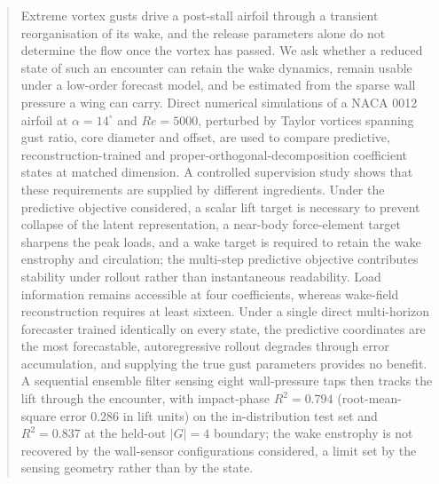 \begin{abstract}
Extreme vortex gusts drive a post-stall airfoil through a transient
reorganisation of its wake, and the release parameters alone do not
determine the flow once the vortex has passed. We ask whether a reduced
state of such an encounter can retain the wake dynamics, remain usable
under a low-order forecast model, and be estimated from the sparse wall
pressure a wing can carry. Direct numerical simulations of a NACA 0012
airfoil at $\alpha = 14^\circ$ and $Re = 5000$, perturbed by Taylor
vortices spanning gust ratio, core diameter and offset, are used to
compare predictive, reconstruction-trained and
proper-orthogonal-decomposition coefficient states at matched dimension.
A controlled supervision study shows that these requirements are
supplied by different ingredients. Under the predictive objective
considered, a scalar lift target is necessary to prevent collapse of the
latent representation, a near-body force-element target sharpens the
peak loads, and a wake target is required to retain the wake enstrophy
and circulation; the multi-step predictive objective contributes
stability under rollout rather than instantaneous readability. Load
information remains accessible at four coefficients, whereas wake-field
reconstruction requires at least sixteen. Under a single direct
multi-horizon forecaster trained identically on every state, the
predictive coordinates are the most forecastable, autoregressive rollout
degrades through error accumulation, and supplying the true gust
parameters provides no benefit. A sequential ensemble filter sensing
eight wall-pressure taps then tracks the lift through the encounter,
with impact-phase $R^2 = 0.794$ (root-mean-square error $0.286$ in lift
units) on the in-distribution test set and $R^2 = 0.837$ at the held-out
$|G| = 4$ boundary; %
the wake enstrophy is not recovered by the wall-sensor configurations
considered, a limit set by the sensing geometry rather than by the
state.
\end{abstract}

